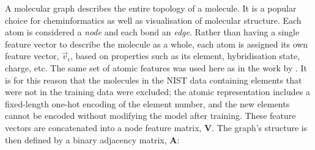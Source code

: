 




A molecular graph describes the entire topology of a molecule. It is a popular
choice for cheminformatics as well as visualisation of molecular structure. Each
atom is considered a \emph{node} and each bond an \emph{edge}. Rather than
having a single feature vector to describe the molecule as a whole, each atom is
assigned its own feature vector, $\vec{v}_i$, based on properties such as its
element, hybridisation state, charge, etc. The same set of atomic features was
used here as in the work by \citet{qinPredictingCriticalMicelle2021}. It is for
this reason that the molecules in the NIST data containing elements that were
not in the training data were excluded; the atomic representation includes a
fixed-length one-hot encoding of the element number, and the new elements cannot
be encoded without modifying the model after training. These feature vectors are
concatenated into a node feature matrix, $\mathbf{V}$. The graph's structure is
then defined by a binary adjacency matrix, $\mathbf{A}$:

